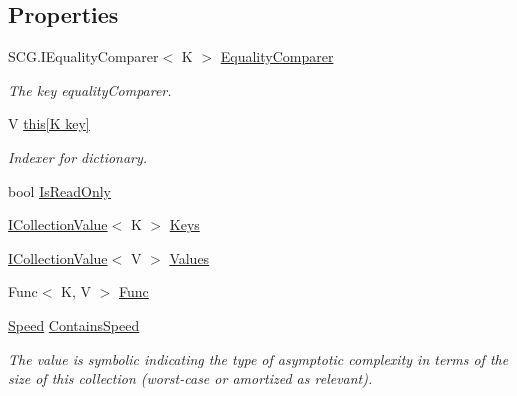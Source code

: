 \subsection*{Properties}
\begin{DoxyCompactItemize}
\item 
S\+C\+G.\+I\+Equality\+Comparer$<$ K $>$ \hyperlink{interface_c5_1_1_i_dictionary_a0bf7369acbd3334ece5ce696517678d3}{Equality\+Comparer}
\begin{DoxyCompactList}\small\item\em The key equality\+Comparer. \end{DoxyCompactList}\item 
V \hyperlink{interface_c5_1_1_i_dictionary_af9e15cebc5c8d59357b5b3bd9d2a7abd}{this\mbox{[}\+K key\mbox{]}}
\begin{DoxyCompactList}\small\item\em Indexer for dictionary. \end{DoxyCompactList}\item 
bool \hyperlink{interface_c5_1_1_i_dictionary_ace8a1dded19cb8d2a60c4c7274ebb321}{Is\+Read\+Only}
\item 
\hyperlink{interface_c5_1_1_i_collection_value}{I\+Collection\+Value}$<$ K $>$ \hyperlink{interface_c5_1_1_i_dictionary_adc8e64e7f441dbf36723fde4734c19d1}{Keys}
\item 
\hyperlink{interface_c5_1_1_i_collection_value}{I\+Collection\+Value}$<$ V $>$ \hyperlink{interface_c5_1_1_i_dictionary_a3c84724a5e4993d0b1e92878829af887}{Values}
\item 
Func$<$ K, V $>$ \hyperlink{interface_c5_1_1_i_dictionary_a253959f9511770e1afe1082d871a4489}{Func}
\item 
\hyperlink{namespace_c5_a615ba88dcdaa8d5a3c5f833a73d7fad6}{Speed} \hyperlink{interface_c5_1_1_i_dictionary_a25c7daa67a85d9b95b9adc15ec06b8be}{Contains\+Speed}
\begin{DoxyCompactList}\small\item\em The value is symbolic indicating the type of asymptotic complexity in terms of the size of this collection (worst-\/case or amortized as relevant). \end{DoxyCompactList}\end{DoxyCompactItemize}


